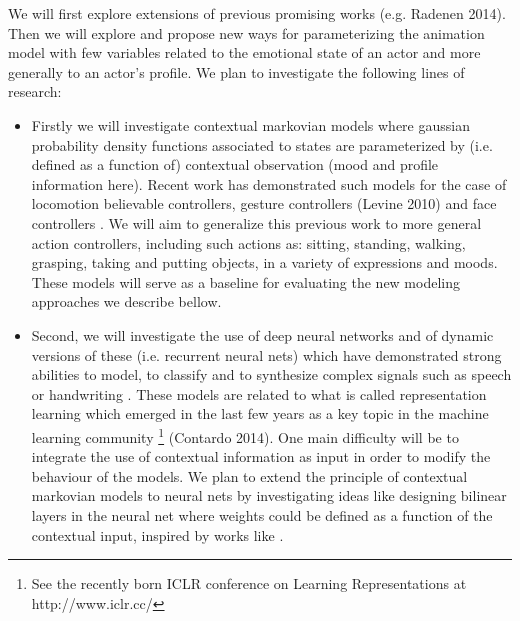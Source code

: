 
We will first explore extensions of previous promising works (e.g. Radenen 2014). Then we will explore and propose new ways for parameterizing the animation model with few variables related to the emotional state of an actor and more generally to an actor's profile. We plan to investigate the following lines of research:
 
\begin{itemize}  
  \item Firstly we will investigate contextual markovian models where gaussian probability density functions associated to states are parameterized by (i.e. defined as a function of) contextual observation (mood and profile information here). Recent work has demonstrated such models for the case of locomotion believable controllers, gesture controllers (Levine 2010) and face controllers \cite{Radenen2014, Ding2013, Ding2014}. We will aim to generalize this previous work to more general action controllers, including such actions as: sitting, standing, walking, grasping, taking and putting objects, in a variety of expressions and moods. These models will serve as a baseline for evaluating the new modeling approaches we describe bellow. 
  \item Second, we will investigate the use of deep neural networks and of dynamic versions of these (i.e. recurrent neural nets) which have demonstrated strong abilities to model, to classify and to synthesize complex signals such as speech or handwriting \cite{HintonDeepSpeech, Deng_Speech_Reco, GravesHWR_Reco, GravesHWR_Synth}. 
  These models are related to what is called representation learning which emerged in the last few years as a key topic in the machine learning community \footnote{See the recently born ICLR conference on Learning Representations at http://www.iclr.cc/} (Contardo 2014). 
  One main difficulty will be to integrate the use of contextual information as input in order to modify the behaviour of the models. We plan to extend the principle of contextual markovian models to neural nets by investigating ideas like designing bilinear layers in the neural net where weights could be defined as a function of the contextual input, inspired by works like \cite{Bilinear, Multiview}.

\end{itemize}
